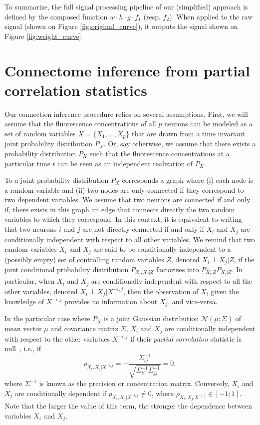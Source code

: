 \documentclass[wcp]{jmlr}
\begin{document}
To summarize, the full signal processing pipeline of our (simplified)
approach is defined by the composed function $w \cdot h \cdot g \cdot f_1$
(resp. $f_2$). When applied to the raw signal (shown on Figure \ref{fig:original_curve}), it outputs the signal shown on Figure \ref{fig:weight_curve}.


\section{Connectome inference from partial correlation statistics}
\label{sec:inference}

Our  connection inference  procedure  relies  on several  assumptions. First,
we will assume that  the fluorescence concentrations of all $p$ neurons can be
modeled as a set of random variables $X = \{X_1, \dots, X_p\}$  that are drawn
from a time invariant joint  probability distribution $P_X$. Or, say otherwise,
we assume that there exists a probability distribution $P_X$ such that the
fluorescence concentrations at a particular time $t$ can be seen as an
independent realization of $P_X$.

To a joint probability distribution $P_X$ corresponds a
graph where (i) each node is a random variable and (ii) two nodes are
only connected if they correspond to two dependent variables. We assume that two neurons are
connected if  and only if,  there exists  in this  graph an edge
that connects  directly the  two random  variables to  which they correspond.
In this context, it is equivalent to writing that two neurons $i$ and $j$ are  not  directly
connected  if and only if  $X_i$  and $X_j$  are  conditionally independent
with  respect to all  other variables. We remind  that two random  variables
$X_i$  and  $X_j$  are  said  to  be  conditionally independent to a (possibly
empty)  set of controlling random variables $Z$, denoted $X_i \perp X_j | Z$,
if the joint conditional probability distribution   $P_{X_i,  X_j   |   Z}$
factorizes  into   $P_{X_i|Z} P_{X_j|Z}$.  In particular,  when  $X_i$ and
$X_j$ are  conditionally independent  with respect  to all  the other
variables, denoted  $X_i \perp  X_j  | X^{-i,j}$,  then  the  observation  of
$X_i$  given  the knowledge  of  $X^{-i,j}$ provides  no information  about
$X_j$,  and vice-versa.

In the  particular case where $P_X$ is  a joint  Gaussian distribution
$\mathcal{N}(\mu; \Sigma)$ of mean  vector $\mu$ and covariance matrix
$\Sigma$, $X_i$  and $X_j$ are conditionally  independent with respect to the
other variables $X^{-i,j}$ if their \textit{partial correlation} statistic is
null~\citep{baba2004partial}, i.e., if
\begin{equation}
\rho_{X_i, X_j | X^{-i,j}} = -\frac{\Sigma^{-1}_{ij}}{\sqrt{\Sigma^{-1}_{ii} \Sigma^{-1}_{jj}}} = 0, \label{eq:inverse}
\end{equation}
where $\Sigma^{-1}$ is known as the precision or concentration matrix. 
Conversely, $X_i$ and $X_j$ are conditionally dependent if $\rho_{X_i, X_j |
X^{-i,j}} \neq 0$, where $\rho_{X_i, X_j | X^{-i,j}} \in [-1;1]$. Note that the
larger the value of this term, the stronger the dependence between variables
$X_i$ and $X_j$.
\end{document}

